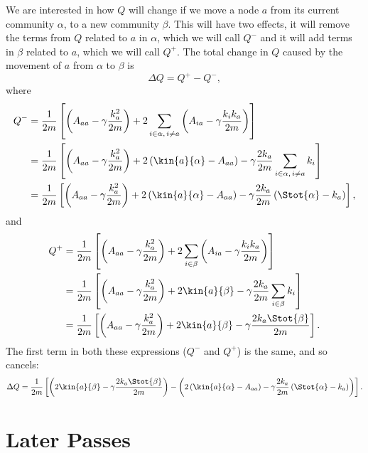 \documentclass{article}
\begin{document}
We are interested in how $Q$ will change if we move a node $a$ from its 
current community $\alpha$, to a new community $\beta$.
This will have two effects, it will remove the terms from $Q$ 
related to $a$ in $\alpha$, which we will call $Q^-$ and it will add terms 
in $\beta$ related to $a$, which we will call $Q^+$. 
The total change in $Q$ caused by the movement of $a$ from $\alpha$ to $\beta$ is 
\begin{equation}
	\Delta Q = Q^{+} - Q^{-},
\end{equation}
where
\begin{align*}
Q^- &= \frac{1}{2m}\left[ \left( A_{aa} - \gamma \frac{k_a^2}{2m} \right) 
+ 2\sum_{i \in \alpha, \, i \neq a} \left( A_{ia} - \gamma \frac{k_ik_a}{2m} \right) \right] \\
	&= \frac{1}{2m}\left[ \left( A_{aa} - \gamma \frac{k_a^2}{2m} \right) 
+ 2 \left( \kin{a}{\alpha} -A_{aa}\right) - \gamma \frac{2k_a}{2m}\sum_{i \in \alpha, \, i \neq a} k_i \right] \\
	&= \frac{1}{2m}\left[ \left( A_{aa} - \gamma \frac{k_a^2}{2m} \right) 
+ 2 \left( \kin{a}{\alpha} -A_{aa}\right) - \gamma \frac{2k_a}{2m}\left( \Stot{\alpha} - k_a \right)  \right], \\
\end{align*}
and
\begin{align*}
Q^+ &= \frac{1}{2m}\left[ \left( A_{aa} - \gamma \frac{k_a^2}{2m} \right) 
+ 2\sum_{i \in \beta} \left( A_{ia} - \gamma \frac{k_ik_a}{2m} \right) \right] \\
		&= \frac{1}{2m}\left[ \left( A_{aa} - \gamma \frac{k_a^2}{2m} \right) 
+ 2\kin{a}{\beta} - \gamma \frac{2k_a}{2m}\sum_{i \in \beta} k_i \right] \\
		&= \frac{1}{2m}\left[ \left( A_{aa} - \gamma \frac{k_a^2}{2m} \right) 
+ 2\kin{a}{\beta} - \gamma \frac{2k_a\Stot{\beta}}{2m} \right]. \\
\end{align*}
The first term in both these expressions ($Q^-$ and $Q^+$) is the same, and so cancels:
\begin{equation}
\Delta Q = \frac{1}{2m}\left[ \left( 2\kin{a}{\beta} - \gamma \frac{2k_a\Stot{\beta}}{2m} \right) 
		- \left( 2 \left( \kin{a}{\alpha} -A_{aa}\right) - \gamma \frac{2k_a}{2m}\left( \Stot{\alpha} - k_a \right) \right) \right]. 
\end{equation}
 
\section{Later Passes}
\label{sec:laterPasses}
\end{document}
